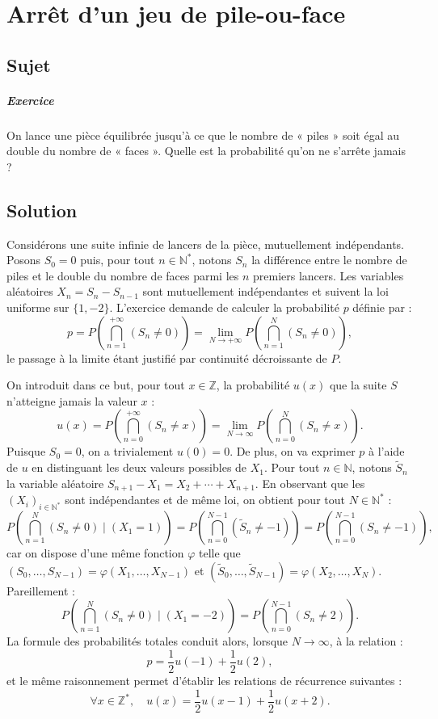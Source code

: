 \chapter{Arrêt d'un jeu de pile-ou-face}

\section{Sujet}

\paragraph{Exercice}

On lance une pièce équilibrée jusqu'à ce que le nombre de « piles » soit égal au double du nombre de « faces ». Quelle est la probabilité qu'on ne s'arrête jamais ?

\section{Solution} %

Considérons une suite infinie de lancers de la pièce, mutuellement indépendants. Posons $S_0 = 0$ puis, pour tout $n \in \mathbb N^*$, notons $S_n$ la différence entre le nombre de piles et le double du nombre de faces parmi les $n$ premiers lancers. Les variables aléatoires $X_n = S_n - S_{n-1}$ sont mutuellement indépendantes et suivent la loi uniforme sur $\{1,-2\}$. L'exercice demande de calculer la probabilité $p$ définie par :
\[
p = P\left(\bigcap_{n=1}^{+\infty} (S_n \neq 0)\right) = \lim_{N\to+\infty} P\left(\bigcap_{n=1}^N (S_n \neq 0)\right),
\]
le passage à la limite étant justifié par continuité décroissante de $P$.

On introduit dans ce but, pour tout $x \in \mathbb Z$, la probabilité $u(x)$ que la suite $S$ n'atteigne jamais la valeur $x$ :
\[
u(x) = P\left(\bigcap_{n=0}^{+\infty} (S_n \neq x)\right) = \lim_{N\to\infty} P\left(\bigcap_{n=0}^N (S_n \neq x)\right).
\]
Puisque $S_0=0$, on a trivialement $u(0) = 0$. De plus, on va exprimer $p$ à l'aide de $u$ en distinguant les deux valeurs possibles de $X_1$. Pour tout $n \in \mathbb N$, notons $\tilde S_n$ la variable aléatoire $S_{n+1} - X_1 = X_2 + \cdots + X_{n+1}$. En observant que les $(X_i)_{i\in\mathbb N^*}$ sont indépendantes et de même loi, on obtient pour tout $N \in \mathbb N^*$ :
\[
P\left(\bigcap_{n=1}^N (S_n \neq 0)\mid (X_1 = 1)\right) = P\left(\bigcap_{n=0}^{N-1} (\tilde S_n \neq -1)\right) = P\left(\bigcap_{n=0}^{N-1} (S_n \neq -1)\right),
\]
car on dispose d'une même fonction $\varphi$ telle que $(S_0,\dots,S_{N-1}) = \varphi(X_1,\dots,X_{N-1})$ et $(\tilde S_0,\dots,\tilde S_{N-1}) = \varphi(X_2,\dots,X_N)$. 
Pareillement :
\[
P\left(\bigcap_{n=1}^N (S_n \neq 0)\mid (X_1 = -2)\right) = P\left(\bigcap_{n=0}^{N-1} (S_n \neq 2)\right).
\]
La formule des probabilités totales conduit alors, lorsque $N \to \infty$, à la relation :
\[
p= \frac12 u(-1) + \frac12 u(2),
\]
et le même raisonnement permet d'établir les relations de récurrence suivantes :
\[
\forall x \in \mathbb Z^*,\quad
u(x) = \frac12 u(x-1) + \frac12 u(x+2).
\]

